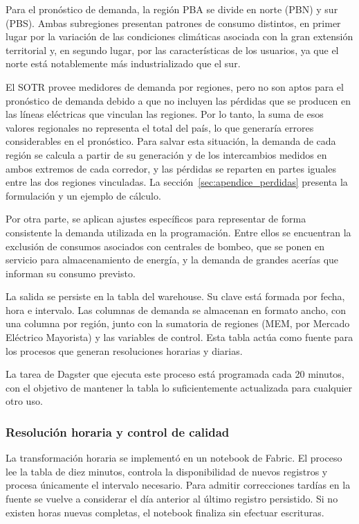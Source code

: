 Para el pronóstico de demanda, la región PBA se divide en norte (PBN) y sur (PBS). Ambas subregiones presentan patrones de consumo distintos, en primer lugar por la variación de las condiciones climáticas asociada con la gran extensión territorial y, en segundo lugar, por las características de los usuarios, ya que el norte está notablemente más industrializado que el sur.

El SOTR provee medidores de demanda por regiones, pero no son aptos para el pronóstico de demanda debido a que no incluyen las pérdidas que se producen en las líneas eléctricas que vinculan las regiones. Por lo tanto, la suma de esos valores regionales no representa el total del país, lo que generaría errores considerables en el pronóstico. Para salvar esta situación, la demanda de cada región se calcula a partir de su generación y de los intercambios medidos en ambos extremos de cada corredor, y las pérdidas se reparten en partes iguales entre las dos regiones vinculadas. La sección~\ref{sec:apendice_perdidas} presenta la formulación y un ejemplo de cálculo.

Por otra parte, se aplican ajustes específicos para representar de forma consistente la demanda utilizada en la programación. Entre ellos se encuentran la exclusión de consumos asociados con centrales de bombeo, que se ponen en servicio para almacenamiento de energía, y la demanda de grandes acerías que informan su consumo previsto.

La salida se persiste en la tabla  del warehouse. Su clave está formada por fecha, hora e intervalo. Las columnas de demanda se almacenan en formato ancho, con una columna por región, junto con la sumatoria de regiones (MEM, por Mercado Eléctrico Mayorista) y las variables de control. Esta tabla actúa como fuente para los procesos que generan resoluciones horarias y diarias.

La tarea de Dagster que ejecuta este proceso está programada cada 20 minutos, con el objetivo de mantener la tabla lo suficientemente actualizada para cualquier otro uso.

\subsubsection{Resolución horaria y control de calidad}
\label{subsec:demanda_10m_1h}

La transformación horaria se implementó en un notebook de Fabric. El proceso lee la tabla de diez minutos, controla la disponibilidad de nuevos registros y procesa únicamente el intervalo necesario. Para admitir correcciones tardías en la fuente se vuelve a considerar el día anterior al último registro persistido. Si no existen horas nuevas completas, el notebook finaliza sin efectuar escrituras.


